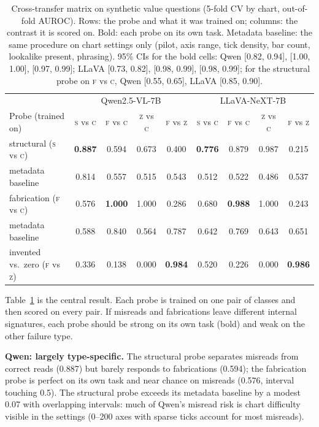 \documentclass[11pt]{article}
\newcommand{\qwen}{Qwen2.5-VL-7B\xspace}
\newcommand{\llava}{LLaVA-NeXT-7B\xspace}
\newcommand{\cls}[1]{\textsc{#1}}
\begin{document}
\begin{table}[t]
\centering\small
\begin{tabular}{l|cccc|cccc}
\toprule
 & \multicolumn{4}{c|}{\qwen} & \multicolumn{4}{c}{\llava} \\
Probe (trained on) & \cls{s} vs \cls{c} & \cls{f} vs \cls{c} & \cls{z} vs \cls{c} & \cls{f} vs \cls{z} & \cls{s} vs \cls{c} & \cls{f} vs \cls{c} & \cls{z} vs \cls{c} & \cls{f} vs \cls{z} \\
\midrule
structural (\cls{s} vs \cls{c}) & \textbf{0.887} & 0.594 & 0.673 & 0.400 & \textbf{0.776} & 0.879 & 0.987 & 0.215 \\
\quad metadata baseline & 0.814 & 0.557 & 0.515 & 0.543 & 0.512 & 0.522 & 0.486 & 0.537 \\
fabrication (\cls{f} vs \cls{c}) & 0.576 & \textbf{1.000} & 1.000 & 0.286 & 0.680 & \textbf{0.988} & 1.000 & 0.243 \\
\quad metadata baseline & 0.588 & 0.840 & 0.564 & 0.787 & 0.642 & 0.769 & 0.643 & 0.651 \\
invented vs.\ zero (\cls{f} vs \cls{z}) & 0.336 & 0.138 & 0.000 & \textbf{0.984} & 0.520 & 0.226 & 0.000 & \textbf{0.986} \\
\bottomrule
\end{tabular}
\caption{Cross-transfer matrix on synthetic value questions (5-fold CV by chart,
out-of-fold AUROC). Rows: the probe and what it was trained on; columns: the
contrast it is scored on. Bold: each probe on its own task. Metadata baseline:
the same procedure on chart settings only (pilot, axis range, tick density, bar
count, lookalike present, phrasing). 95\% CIs for the bold cells: Qwen
[0.82, 0.94], [1.00, 1.00], [0.97, 0.99]; LLaVA [0.73, 0.82], [0.98, 0.99],
[0.98, 0.99]; for the structural probe on \cls{f} vs \cls{c}, Qwen
[0.55, 0.65], LLaVA [0.85, 0.90].}
\label{tab:matrix}
\end{table}

Table~\ref{tab:matrix} is the central result. Each probe is trained on one pair
of classes and then scored on every pair. If misreads and fabrications leave
different internal signatures, each probe should be strong on its own task
(bold) and weak on the other failure type.

\textbf{Qwen: largely type-specific.} The structural probe separates misreads
from correct reads (0.887) but barely responds to fabrications (0.594); the
fabrication probe is perfect on its own task and near chance on misreads
(0.576, interval touching 0.5). The structural probe exceeds its metadata
baseline by a modest 0.07 with overlapping intervals: much of Qwen's misread
risk is chart difficulty visible in the settings (0--200 axes with sparse ticks
account for most misreads).
\end{document}
